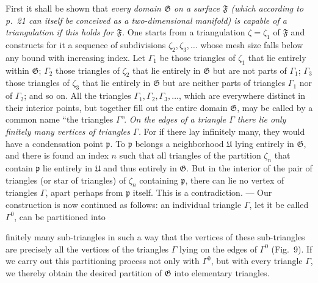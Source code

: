 \documentclass{article}
\begin{document}
First it shall be shown that \emph{every domain $\mathfrak{G}$ on a surface $\mathfrak{F}$ (which according to p.\ 21 can itself be conceived as a two-dimensional manifold) is capable of a triangulation if this holds for $\mathfrak{F}$.} One starts from a triangulation $\zeta = \zeta_1$ of $\mathfrak{F}$ and constructs for it a sequence of subdivisions $\zeta_2, \zeta_3, \dots$ whose mesh size falls below any bound with increasing index. Let $\varGamma_1$ be those triangles of $\zeta_1$ that lie entirely within $\mathfrak{G}$; $\varGamma_2$ those triangles of $\zeta_2$ that lie entirely in $\mathfrak{G}$ but are not parts of $\varGamma_1$; $\varGamma_3$ those triangles of $\zeta_3$ that lie entirely in $\mathfrak{G}$ but are neither parts of triangles $\varGamma_1$ nor of $\varGamma_2$; and so on. All the triangles $\varGamma_1, \varGamma_2, \varGamma_3, \dots$, which are everywhere distinct in their interior points, but together fill out the entire domain $\mathfrak{G}$, may be called by a common name ``the triangles $\varGamma$''. \emph{On the edges of a triangle $\varGamma$ there lie only finitely many vertices of triangles $\varGamma$.} For if there lay infinitely many, they would have a condensation point $\mathfrak{p}$. To $\mathfrak{p}$ belongs a neighborhood $\mathfrak{U}$ lying entirely in $\mathfrak{G}$, and there is found an index $n$ such that all triangles of the partition $\zeta_n$ that contain $\mathfrak{p}$ lie entirely in $\mathfrak{U}$ and thus entirely in $\mathfrak{G}$. But in the interior of the pair of triangles (or star of triangles) of $\zeta_n$ containing $\mathfrak{p}$, there can lie no vertex of triangles $\varGamma$, apart perhaps from $\mathfrak{p}$ itself. This is a contradiction. --- Our construction is now continued as follows: an individual triangle $\varGamma$, let it be called $\varGamma^0$, can be partitioned into

finitely many sub-triangles in such a way that the vertices of these sub-triangles are precisely all the vertices of the triangles $\varGamma$ lying on the edges of $\varGamma^0$ (Fig.~9). If we carry out this partitioning process not only with $\varGamma^0$, but with every triangle $\varGamma$, we thereby obtain the desired partition of $\mathfrak{G}$ into elementary triangles.

\end{document}
